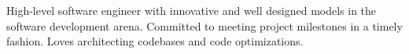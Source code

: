 
\par{
High-level software engineer with innovative and well designed models in the software development arena. Committed to meeting project milestones in a timely fashion. Loves architecting codebases and code optimizations.
}
